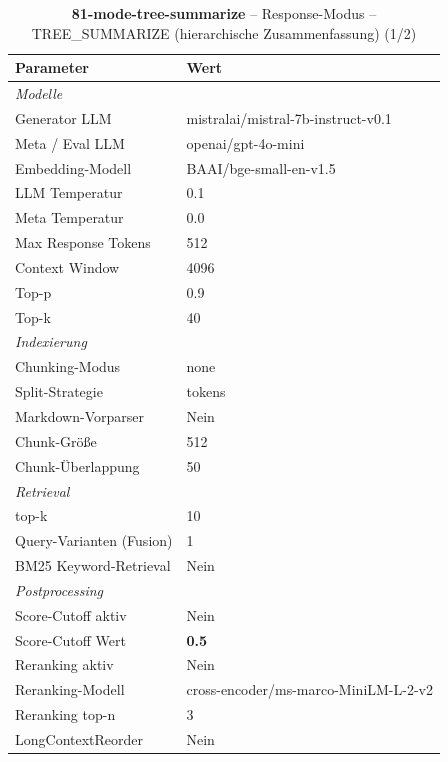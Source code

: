 \begin{table}[H]
\centering
\small
\setlength{\tabcolsep}{4pt}
\begin{tabular}{lp{8cm}}
\toprule
\textbf{Parameter} & \textbf{Wert} \\
\midrule
\multicolumn{2}{l}{\textit{Modelle}} \\
\midrule
\quad Generator LLM & mistralai/mistral-7b-instruct-v0.1 \\
\quad Meta / Eval LLM & openai/gpt-4o-mini \\
\quad Embedding-Modell & BAAI/bge-small-en-v1.5 \\
\quad LLM Temperatur & 0.1 \\
\quad Meta Temperatur & 0.0 \\
\quad Max Response Tokens & 512 \\
\quad Context Window & 4096 \\
\quad Top-p & 0.9 \\
\quad Top-k & 40 \\
\midrule
\multicolumn{2}{l}{\textit{Indexierung}} \\
\midrule
\quad Chunking-Modus & none \\
\quad Split-Strategie & tokens \\
\quad Markdown-Vorparser & Nein \\
\quad Chunk-Größe & 512 \\
\quad Chunk-Überlappung & 50 \\
\midrule
\multicolumn{2}{l}{\textit{Retrieval}} \\
\midrule
\quad top-k & 10 \\
\quad Query-Varianten (Fusion) & 1 \\
\quad BM25 Keyword-Retrieval & Nein \\
\midrule
\multicolumn{2}{l}{\textit{Postprocessing}} \\
\midrule
\quad Score-Cutoff aktiv & Nein \\
\quad Score-Cutoff Wert & \textbf{0.5} \\
\quad Reranking aktiv & Nein \\
\quad Reranking-Modell & cross-encoder/ms-marco-MiniLM-L-2-v2 \\
\quad Reranking top-n & 3 \\
\quad LongContextReorder & Nein \\
\bottomrule
\end{tabular}
\caption{\textbf{81-mode-tree-summarize} -- Response-Modus -- TREE\_SUMMARIZE (hierarchische Zusammenfassung) (1/2)}
\label{tab:config_81_mode_tree_summarize_a}
\end{table}

